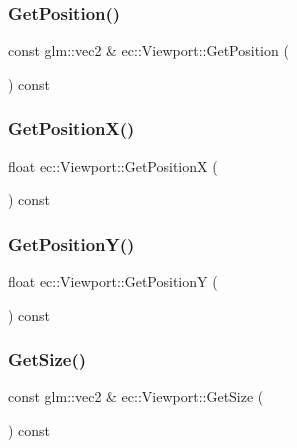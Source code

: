 \subsubsection{\texorpdfstring{Get\+Position()}{GetPosition()}}
{\footnotesize\ttfamily const glm\+::vec2 \& ec\+::\+Viewport\+::\+Get\+Position (\begin{DoxyParamCaption}{ }\end{DoxyParamCaption}) const}

\mbox{\label{classec_1_1_viewport_a9eb9dd217b11d9f7fa1ffb2c76bc60a9}} 
\subsubsection{\texorpdfstring{Get\+Position\+X()}{GetPositionX()}}
{\footnotesize\ttfamily float ec\+::\+Viewport\+::\+Get\+PositionX (\begin{DoxyParamCaption}{ }\end{DoxyParamCaption}) const}

\mbox{\label{classec_1_1_viewport_ab3b320481304aec2aee3f1ee53793898}} 
\subsubsection{\texorpdfstring{Get\+Position\+Y()}{GetPositionY()}}
{\footnotesize\ttfamily float ec\+::\+Viewport\+::\+Get\+PositionY (\begin{DoxyParamCaption}{ }\end{DoxyParamCaption}) const}

\mbox{\label{classec_1_1_viewport_a128183b59733fcef73d52a9f61f82181}} 
\subsubsection{\texorpdfstring{Get\+Size()}{GetSize()}}
{\footnotesize\ttfamily const glm\+::vec2 \& ec\+::\+Viewport\+::\+Get\+Size (\begin{DoxyParamCaption}{ }\end{DoxyParamCaption}) const}

